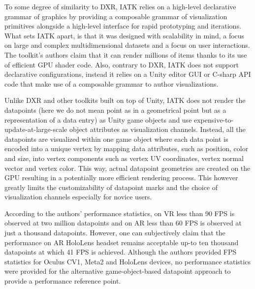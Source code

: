 \documentclass{vgtc}                          %
\begin{document}
\smallskip

\noindent To some degree of similarity to DXR, IATK relies on a high-level
declarative grammar of graphics by providing a composable grammar of
visualization primitives alongside a high-level interface for rapid prototyping
and iterations. What sets IATK apart, is that it was designed with scalability
in mind, a focus on large and complex multidimensional datasets and a focus on
user interactions. The toolkit's authors claim that it can render millions of
items thanks to its use of efficient GPU shader code. Also, contrary to DXR,
IATK does not support declarative configurations, instead it relies on a Unity
editor GUI or C-sharp API code that make use of a composable grammar to author
visualizations.

\smallskip

\noindent Unlike DXR and other toolkits built on top of Unity, IATK does not
render the datapoints (here we do not mean point as in a geometrical point but
as a representation of a data entry) as Unity game objects and use
expensive-to-update-at-large-scale object attributes as visualization channels.
Instead, all the datapoints are visualized within one game object where each
data point is encoded into a unique vertex by mapping data attributes,
such as position, color and size, into vertex components such as vertex UV
coordinates, vertex normal vector and vertex color. This way, actual datapoint
geometries are created on the GPU resulting in a potentially more
efficient rendering process. This however greatly limits the customizability
of datapoint marks and the choice of visualization channels especially for
novice users.

\smallskip

\noindent According to the authors' performance statistics, on VR less than
90 FPS is observed at two million datapoints and on AR less than 60 FPS is
observed at just a thousand datapoints. However, one can subjectively claim
that the performance on AR HoloLens headset remains acceptable up-to ten
thousand datapoints at which 41 FPS is achieved. Although the authors provided
FPS statistics for Oculus CV1, Meta2 and HoloLens devices, no performance
statistics were provided for the alternative game-object-based datapoint
approach to provide a performance reference point.
\end{document}
